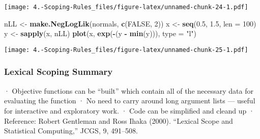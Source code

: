 \documentclass[
]{article}
\newenvironment{Shaded}{\begin{snugshade}}{\end{snugshade}}
\newcommand{\AttributeTok}[1]{\textcolor[rgb]{0.13,0.29,0.53}{#1}}
\newcommand{\ConstantTok}[1]{\textcolor[rgb]{0.56,0.35,0.01}{#1}}
\newcommand{\DecValTok}[1]{\textcolor[rgb]{0.00,0.00,0.81}{#1}}
\newcommand{\FloatTok}[1]{\textcolor[rgb]{0.00,0.00,0.81}{#1}}
\newcommand{\FunctionTok}[1]{\textcolor[rgb]{0.13,0.29,0.53}{\textbf{#1}}}
\newcommand{\NormalTok}[1]{#1}
\newcommand{\OtherTok}[1]{\textcolor[rgb]{0.56,0.35,0.01}{#1}}
\newcommand{\SpecialCharTok}[1]{\textcolor[rgb]{0.81,0.36,0.00}{\textbf{#1}}}
\newcommand{\StringTok}[1]{\textcolor[rgb]{0.31,0.60,0.02}{#1}}
\begin{document}
\texttt{[image: 4.-Scoping-Rules\_files/figure-latex/unnamed-chunk-24-1.pdf]}

\begin{Shaded}
\begin{Highlighting}[]
\NormalTok{nLL }\OtherTok{\textless{}{-}} \FunctionTok{make.NegLogLik}\NormalTok{(normals, }\FunctionTok{c}\NormalTok{(}\ConstantTok{FALSE}\NormalTok{, }\DecValTok{2}\NormalTok{))}
\NormalTok{x }\OtherTok{\textless{}{-}} \FunctionTok{seq}\NormalTok{(}\FloatTok{0.5}\NormalTok{, }\FloatTok{1.5}\NormalTok{, }\AttributeTok{len =} \DecValTok{100}\NormalTok{)}
\NormalTok{y }\OtherTok{\textless{}{-}} \FunctionTok{sapply}\NormalTok{(x, nLL)}
\FunctionTok{plot}\NormalTok{(x, }\FunctionTok{exp}\NormalTok{(}\SpecialCharTok{{-}}\NormalTok{(y }\SpecialCharTok{{-}} \FunctionTok{min}\NormalTok{(y))), }\AttributeTok{type =} \StringTok{"l"}\NormalTok{)}
\end{Highlighting}
\end{Shaded}

\texttt{[image: 4.-Scoping-Rules\_files/figure-latex/unnamed-chunk-25-1.pdf]}

\hypertarget{lexical-scoping-summary}{%
\subsubsection{Lexical Scoping Summary}\label{lexical-scoping-summary}}

· Objective functions can be ``built'' which contain all of the
necessary data for evaluating the function · No need to carry around
long argument lists --- useful for interactive and exploratory work. ·
Code can be simplified and cleand up · Reference: Robert Gentleman and
Ross Ihaka (2000). ``Lexical Scope and Statistical Computing,'' JCGS, 9,
491--508.
\end{document}
